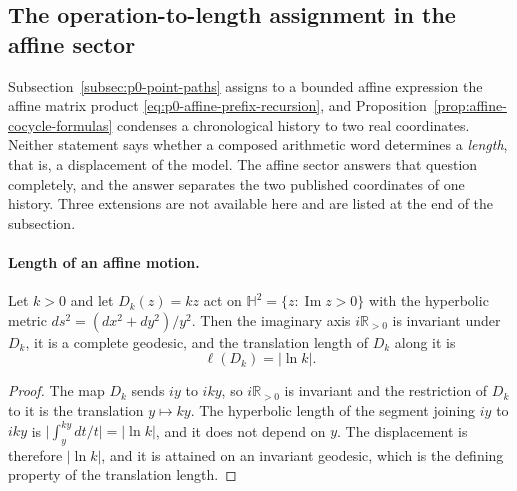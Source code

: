 \subsection{The operation-to-length assignment in the affine sector}
\label{subsec:p0-operation-to-length}

Subsection~\ref{subsec:p0-point-paths} assigns to a bounded affine expression the
affine matrix product \eqref{eq:p0-affine-prefix-recursion}, and
Proposition~\ref{prop:affine-cocycle-formulas} condenses a chronological history to
two real coordinates.  Neither statement says whether a composed arithmetic word
determines a \emph{length}, that is, a displacement of the model.  The affine sector
answers that question completely, and the answer separates the two published
coordinates of one history.  Three extensions are not available here and are listed
at the end of the subsection.

\paragraph{Length of an affine motion.}

\begin{proposition}
\label{prop:p0-dilation-length}
Let $k>0$ and let $D_k(z)=kz$ act on $\mathbb H^2=\{z:\operatorname{Im}z>0\}$ with
the hyperbolic metric $ds^2=(dx^2+dy^2)/y^2$.  Then the imaginary axis
$i\mathbb R_{>0}$ is invariant under $D_k$, it is a complete geodesic, and the
translation length of $D_k$ along it is
\begin{equation}\label{eq:p0-dilation-length}
  \ell(D_k)=\bigl\lvert\ln k\bigr\rvert .
\end{equation}
\end{proposition}

\begin{proof}
The map $D_k$ sends $iy$ to $iky$, so $i\mathbb R_{>0}$ is invariant and the
restriction of $D_k$ to it is the translation $y\mapsto ky$.  The hyperbolic length
of the segment joining $iy$ to $iky$ is
$\bigl\lvert\int_y^{ky}dt/t\bigr\rvert=\lvert\ln k\rvert$, and it does not depend on
$y$.  The displacement is therefore $\lvert\ln k\rvert$, and it is attained on an
invariant geodesic, which is the defining property of the translation length.
\end{proof}

